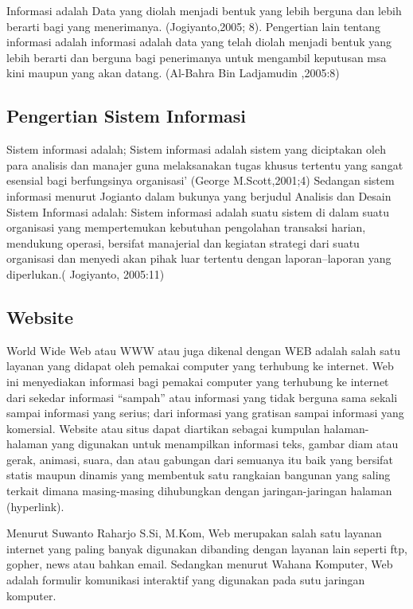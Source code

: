 \documentclass{jtetiproposalskripsi}
\begin{document}
Informasi  adalah Data yang diolah menjadi bentuk yang lebih berguna dan lebih berarti bagi yang menerimanya. (Jogiyanto,2005; 8). Pengertian lain tentang   informasi adalah informasi adalah data yang telah  diolah  menjadi bentuk yang lebih berarti dan berguna bagi  penerimanya untuk mengambil keputusan msa kini maupun  yang akan datang. (Al-Bahra Bin Ladjamudin ,2005:8) 

\subsection{Pengertian Sistem Informasi}
Sistem informasi adalah; Sistem informasi adalah sistem yang diciptakan oleh para analisis dan manajer guna melaksanakan tugas khusus tertentu yang sangat esensial bagi berfungsinya organisasi’ (George M.Scott,2001;4) Sedangan sistem informasi menurut Jogianto dalam  bukunya yang berjudul  Analisis dan Desain Sistem Informasi adalah:  Sistem informasi adalah suatu sistem di dalam suatu  organisasi yang mempertemukan kebutuhan pengolahan  transaksi harian, mendukung operasi, bersifat manajerial dan kegiatan strategi dari suatu organisasi dan menyedi akan pihak  luar tertentu dengan laporan–laporan yang  diperlukan.( Jogiyanto, 2005:11) 

\subsection{Website}
World Wide Web atau WWW atau juga dikenal dengan WEB adalah salah satu layanan yang didapat oleh pemakai computer yang terhubung ke internet. Web ini menyediakan informasi bagi pemakai computer yang terhubung ke internet dari sekedar informasi “sampah” atau informasi yang tidak berguna sama sekali sampai informasi yang serius; dari informasi yang gratisan sampai informasi yang komersial. Website atau situs dapat diartikan sebagai kumpulan halaman-halaman yang digunakan untuk menampilkan informasi teks, gambar diam atau gerak, animasi, suara, dan atau gabungan dari semuanya itu baik yang bersifat statis maupun dinamis yang membentuk satu rangkaian bangunan yang saling terkait dimana masing-masing dihubungkan dengan jaringan-jaringan halaman (hyperlink).

Menurut Suwanto Raharjo S.Si, M.Kom, Web merupakan salah satu layanan internet yang paling banyak digunakan dibanding dengan layanan lain seperti ftp, gopher, news atau bahkan email. Sedangkan menurut Wahana Komputer, Web adalah formulir komunikasi interaktif yang digunakan pada sutu jaringan komputer. 
\end{document}
